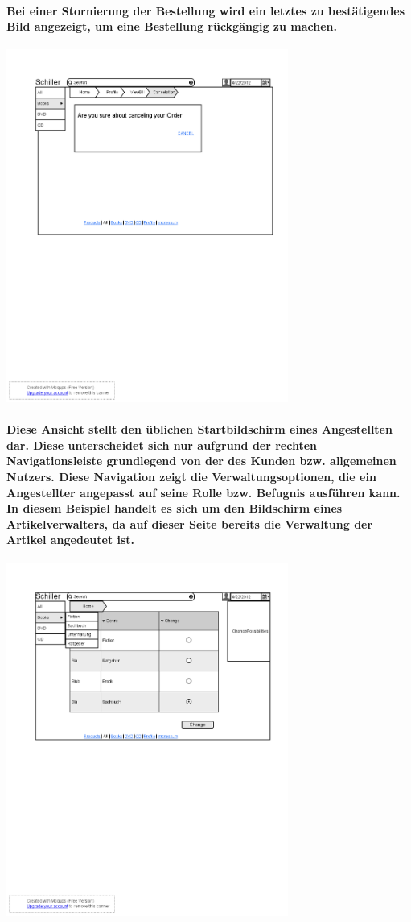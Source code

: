 \documentclass[a4paper]{article}
\begin{document}
\paragraph{Bei einer Stornierung der Bestellung wird ein letztes zu bestätigendes Bild angezeigt, um eine Bestellung rückgängig zu machen.\\}
\includegraphics[width=350px]{13Cancelation.png}

\paragraph{Diese Ansicht stellt den üblichen Startbildschirm eines Angestellten dar. Diese unterscheidet sich nur aufgrund der rechten Navigationsleiste grundlegend von der des Kunden bzw. allgemeinen Nutzers. Diese Navigation zeigt die Verwaltungsoptionen, die ein Angestellter angepasst auf seine Rolle bzw. Befugnis ausführen kann.\\
In diesem Beispiel handelt es sich um den Bildschirm eines Artikelverwalters, da auf dieser Seite bereits die Verwaltung der Artikel angedeutet ist.\\}
\includegraphics[width=350px]{14Home_Employee.png}
\end{document}
